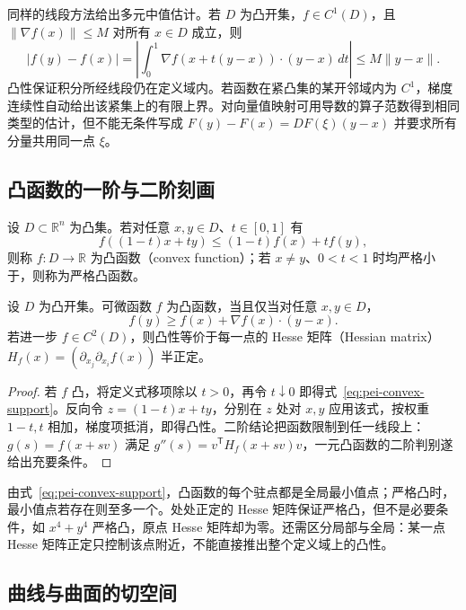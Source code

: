 同样的线段方法给出多元中值估计。若 $D$ 为凸开集，$f\in C^1(D)$，且 $\|\nabla f(x)\|\le M$ 对所有 $x\in D$ 成立，则
\begin{equation}
\label{eq:pei-gradient-lipschitz}
|f(y)-f(x)|=\left|\int_0^1\nabla f(x+t(y-x))\cdot(y-x)\,dt\right|\le M\|y-x\|.
\end{equation}
凸性保证积分所经线段仍在定义域内。若函数在紧凸集的某开邻域内为 $C^1$，梯度连续性自动给出该紧集上的有限上界。对向量值映射可用导数的算子范数得到相同类型的估计，但不能无条件写成 $F(y)-F(x)=DF(\xi)(y-x)$ 并要求所有分量共用同一点 $\xi$。

\subsection{凸函数的一阶与二阶刻画}

\begin{definition}
设 $D\subset\mathbb R^n$ 为凸集。若对任意 $x,y\in D$、$t\in[0,1]$ 有
\[
f((1-t)x+ty)\le(1-t)f(x)+tf(y),
\]
则称 $f:D\to\mathbb R$ 为凸函数（convex function）；若 $x\ne y$、$0<t<1$ 时均严格小于，则称为严格凸函数。
\end{definition}

\begin{theorem}
\label{thm:pei-convexity-criteria}
设 $D$ 为凸开集。可微函数 $f$ 为凸函数，当且仅当对任意 $x,y\in D$，
\begin{equation}
\label{eq:pei-convex-support}
f(y)\ge f(x)+\nabla f(x)\cdot(y-x).
\end{equation}
若进一步 $f\in C^2(D)$，则凸性等价于每一点的 Hesse 矩阵（Hessian matrix）$H_f(x)=(\partial_{x_j}\partial_{x_i}f(x))$ 半正定。
\end{theorem}
\begin{proof}
若 $f$ 凸，将定义式移项除以 $t>0$，再令 $t\downarrow0$ 即得式~\eqref{eq:pei-convex-support}。反向令 $z=(1-t)x+ty$，分别在 $z$ 处对 $x,y$ 应用该式，按权重 $1-t,t$ 相加，梯度项抵消，即得凸性。二阶结论把函数限制到任一线段上：$g(s)=f(x+sv)$ 满足 $g''(s)=v^{\mathsf T}H_f(x+sv)v$，一元凸函数的二阶判别遂给出充要条件。
\end{proof}

由式~\eqref{eq:pei-convex-support}，凸函数的每个驻点都是全局最小值点；严格凸时，最小值点若存在则至多一个。处处正定的 Hesse 矩阵保证严格凸，但不是必要条件，如 $x^4+y^4$ 严格凸，原点 Hesse 矩阵却为零。还需区分局部与全局：某一点 Hesse 矩阵正定只控制该点附近，不能直接推出整个定义域上的凸性。

\subsection{曲线与曲面的切空间}

